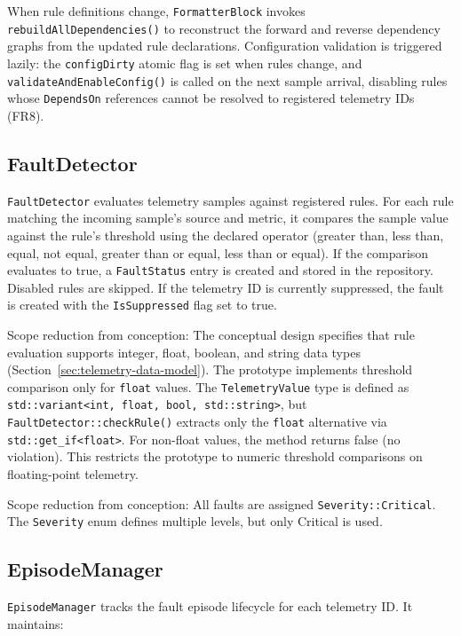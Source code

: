 When rule definitions change, \texttt{FormatterBlock} invokes \texttt{rebuildAllDependencies()} to reconstruct the forward and reverse dependency graphs from the updated rule declarations. Configuration validation is triggered lazily: the \texttt{configDirty} atomic flag is set when rules change, and \texttt{validateAndEnableConfig()} is called on the next sample arrival, disabling rules whose \texttt{DependsOn} references cannot be resolved to registered telemetry IDs (FR8).

\subsection{FaultDetector}

\texttt{FaultDetector} evaluates telemetry samples against registered rules. For each rule matching the incoming sample's source and metric, it compares the sample value against the rule's threshold using the declared operator (greater than, less than, equal, not equal, greater than or equal, less than or equal). If the comparison evaluates to true, a \texttt{FaultStatus} entry is created and stored in the repository. Disabled rules are skipped. If the telemetry ID is currently suppressed, the fault is created with the \texttt{IsSuppressed} flag set to true.

Scope reduction from conception: The conceptual design specifies that rule evaluation supports integer, float, boolean, and string data types (Section~\ref{sec:telemetry-data-model}). The prototype implements threshold comparison only for \texttt{float} values. The \texttt{TelemetryValue} type is defined as \texttt{std::variant<int, float, bool, std::string>}, but \texttt{FaultDetector::checkRule()} extracts only the \texttt{float} alternative via \texttt{std::get\_if<float>}. For non-float values, the method returns false (no violation). This restricts the prototype to numeric threshold comparisons on floating-point telemetry.

Scope reduction from conception: All faults are assigned \texttt{Severity::Critical}. The \texttt{Severity} enum defines multiple levels, but only Critical is used.

\subsection{EpisodeManager}

\texttt{EpisodeManager} tracks the fault episode lifecycle for each telemetry ID. It maintains:


